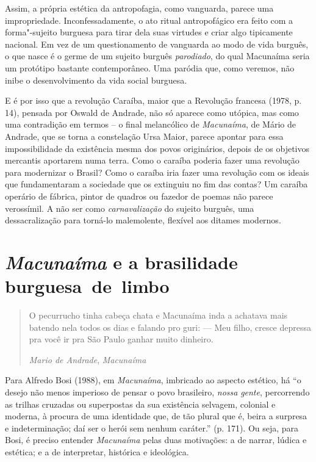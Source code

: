 Assim, a própria estética da antropofagia, como vanguarda, parece uma
impropriedade. Inconfessadamente, o ato ritual antropofágico era feito
com a forma"-sujeito burguesa para tirar dela suas virtudes e criar algo
tipicamente nacional. Em vez de um questionamento de vanguarda ao modo
de vida burguês, o que nasce é o germe de um sujeito burguês
\emph{parodiado}, do qual Macunaíma seria um protótipo bastante
contemporâneo. Uma paródia que, como veremos, não inibe o
desenvolvimento da vida social burguesa.

E é por isso que a revolução Caraíba, maior que a Revolução francesa
(1978, p. 14), pensada por Oswald de Andrade, não só aparece como
utópica, mas como uma contradição em termos -- o final melancólico de
\emph{Macunaíma}, de Mário de Andrade, que se torna a constelação Ursa
Maior, parece apontar para essa impossibilidade da existência mesma dos
povos originários, depois de os objetivos mercantis aportarem numa
terra. Como o caraíba poderia fazer uma revolução para modernizar o
Brasil? Como o caraíba iria fazer uma revolução com os ideais que
fundamentaram a sociedade que os extinguiu no fim das contas? Um caraíba
operário de fábrica, pintor de quadros ou fazedor de poemas não parece
verossímil. A não ser como \emph{carnavalização} do sujeito burguês, uma
dessacralização para torná-lo malemolente, flexível aos ditames
modernos.

\section{\emph{Macunaíma} e a brasilidade burguesa~de~limbo}

\begin{quote}
O pecurrucho tinha cabeça chata e Macunaíma inda a achatava mais batendo
nela todos os dias e falando pro guri:
--- Meu filho, cresce depressa pra você ir pra São Paulo ganhar muito
  dinheiro.

\emph{Mario de Andrade}, \emph{Macunaíma}
\end{quote}

Para Alfredo Bosi (1988), em \emph{Macunaíma}, imbricado ao aspecto
estético, há ``o desejo não menos imperioso de pensar o povo brasileiro,
\emph{nossa} \emph{gente}, percorrendo as trilhas cruzadas ou
superpostas da sua existência selvagem, colonial e moderna, à procura de
uma identidade que, de tão plural que é, beira a surpresa e
indeterminação; daí ser o herói sem nenhum caráter.'' (p. 171). Ou seja,
para Bosi, é preciso entender \emph{Macunaíma} pelas duas motivações: a
de narrar, lúdica e estética; e a de interpretar, histórica e
ideológica.

